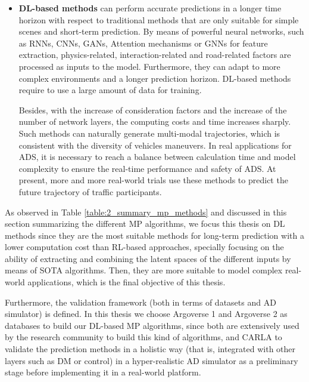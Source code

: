 \begin{itemize}
	\item \textbf{\ac{DL}-based methods} can perform accurate predictions in a longer time horizon with respect to traditional methods that are only suitable for simple scenes and short-term prediction. By means of powerful neural networks, such as \acp{RNN}, \acp{CNN}, \acp{GAN}, Attention mechanisms or \acp{GNN} for feature extraction, physics-related, interaction-related and road-related factors are processed as inputs to the model. Furthermore, they can adapt to more complex environments and a longer prediction horizon. \ac{DL}-based methods require to use a large amount of data for training.
	
	Besides, with the increase of consideration factors and the increase of the number of network layers, the computing costs and time increases sharply. Such methods can naturally generate multi-modal trajectories, which is consistent with the diversity of vehicles maneuvers. In real applications for \ac{ADS}, it is necessary to reach a balance between calculation time and model complexity to ensure the real-time performance and safety of \ac{ADS}. At present, more and more real-world trials use these methods to predict the future trajectory of traffic participants.
\end{itemize}	
	
As observed in Table \ref{table:2_summary_mp_methods} and discussed in this section summarizing the different \ac{MP} algorithms, we focus this thesis on \ac{DL} methods since they are the most suitable methods for long-term prediction with a lower computation cost than \ac{RL}-based approaches, specially focusing on the ability of extracting and combining the latent spaces of the different inputs by means of \ac{SOTA} algorithms. Then, they are more suitable to model complex real-world applications, which is the final objective of this thesis.

Furthermore, the validation framework (both in terms of datasets and \ac{AD} simulator) is defined. In this thesis we choose Argoverse 1 and Argoverse 2 as databases to build our \ac{DL}-based \ac{MP} algorithms, since both are extensively used by the research community to build this kind of algorithms, and \ac{CARLA} to validate the prediction methods in a holistic way (that is, integrated with other layers such as \ac{DM} or control) in a hyper-realistic \ac{AD} simulator as a preliminary stage before implementing it in a real-world platform.